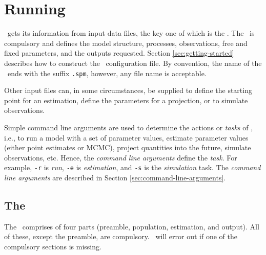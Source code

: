 \section{Running \SPM\label{sec:running-spm}}

\SPM\ gets its information from input data files, the key one of which is the \config{}. The \config\ is compulsory and defines the model structure, processes, observations, free and fixed parameters, and the outputs requested. Section \ref{sec:getting-started} describes how to construct the \SPM\ configuration file. By convention, the name of the \config\ ends with the suffix \texttt{.spm}, however, any file name is acceptable.

Other input files can, in some circumstances, be supplied to define the starting point for an estimation, define the parameters for a projection, or to simulate observations.  

Simple command line arguments are used to determine the actions or \emph{tasks} of \SPM, i.e., to run a model with a set of parameter values, estimate parameter values (either point estimates or MCMC), project quantities into the future, simulate observations, etc. Hence, the \emph{command line arguments} define the \emph{task}. For example, \texttt{-r} is \emph{run}, \texttt{-e} is \emph{estimation}, and \texttt{-s} is the \emph{simulation} task. The \emph{command line arguments} are described in Section \ref{sec:command-line-arguments}.

\subsection{The \config\label{sec:config-files}}

The \config\ comprises of four parts (preamble, population, estimation, and output). All of these, except the preamble, are compulsory. \SPM\ will error out if one of the compulsory sections is missing.

